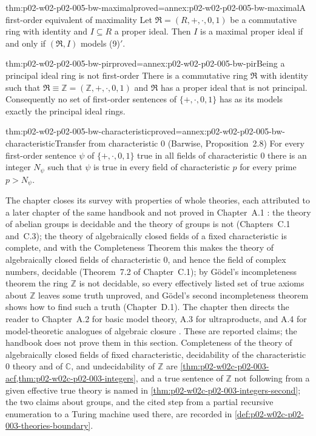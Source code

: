 \begin{hbtheorem}{thm:p02-w02-p02-005-bw-maximal}{proved=annex:p02-w02-p02-005-bw-maximal}{A first-order equivalent of maximality}
Let \(\mathfrak R=(R,+,\cdot,0,1)\) be a commutative ring with identity
and \(I\subseteq R\) a proper ideal.  Then \(I\) is a maximal proper ideal
if and only if \((\mathfrak R,I)\) models (9)\('\).
\end{hbtheorem}

\begin{hbtheorem}{thm:p02-w02-p02-005-bw-pir}{proved=annex:p02-w02-p02-005-bw-pir}{Being a principal ideal ring is not first-order}
There is a commutative ring \(\mathfrak R\) with identity such that
\(\mathfrak R\equiv\mathbb Z=(\mathbb Z,+,\cdot,0,1)\) and \(\mathfrak R\)
has a proper ideal that is not principal.  Consequently no set of
first-order sentences of \(\{+,\cdot,0,1\}\) has as its models exactly the
principal ideal rings.
\end{hbtheorem}

\begin{hbtheorem}{thm:p02-w02-p02-005-bw-characteristic}{proved=annex:p02-w02-p02-005-bw-characteristic}{Transfer from characteristic \(0\) (Barwise, Proposition~2.8)}
For every first-order sentence \(\psi\) of \(\{+,\cdot,0,1\}\) true in all
fields of characteristic \(0\) there is an integer \(N_\psi\) such that
\(\psi\) is true in every field of characteristic \(p\) for every prime
\(p>N_\psi\).
\end{hbtheorem}

The chapter closes its survey with properties of whole theories, each
attributed to a later chapter of the same handbook and not proved in
Chapter~A.1 \cite[ch.~A.1, \S2, p.~16]{Barwise1977FirstOrder}: the theory
of abelian groups is decidable and the theory of groups is not
(Chapters~C.1 and~C.3); the theory of algebraically closed fields of a
fixed characteristic is complete, and with the Completeness Theorem this
makes the theory of algebraically closed fields of characteristic \(0\),
and hence the field of complex numbers, decidable (Theorem~7.2 of
Chapter~C.1); by G\"odel's incompleteness theorem the ring \(\mathbb Z\)
is not decidable, so every effectively listed set of true axioms about
\(\mathbb Z\) leaves some truth unproved, and G\"odel's second incompleteness theorem
shows how to find such a truth (Chapter~D.1).  The chapter then
directs the reader to Chapter~A.2 for basic model theory, A.3 for
ultraproducts, and A.4 for model-theoretic analogues of algebraic closure
\cite[ch.~A.1, \S2, p.~17]{Barwise1977FirstOrder}.  These are reported
claims; the handbook does not prove them in this section.  Completeness of
the theory of algebraically closed fields of fixed characteristic,
decidability of the characteristic~\(0\) theory and of \(\mathbb C\), and
undecidability of \(\mathbb Z\) are
\cref{thm:p02-w02c-p02-003-acf,thm:p02-w02c-p02-003-integers}, and a
true sentence of \(\mathbb Z\) not following from a given effective true
theory is named in \cref{thm:p02-w02c-p02-003-integers-second}; the two
claims about groups, and the cited step from a partial recursive
enumeration to a Turing machine used there, are recorded in
\cref{def:p02-w02c-p02-003-theories-boundary}.

